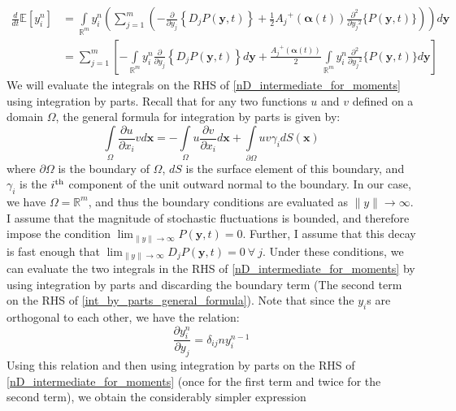 \begin{align}
\frac{d}{dt}\mathbb{E}[y_i^n] &= \int\limits_{\mathbb{R}^m} y_i^n \left(\sum\limits_{j=1}^{m}\left(-\frac{\partial}{\partial y_j}\left\{D_{j}P(\mathbf{y},t)\right\}+\frac{1}{2}{A_j}^{+}(\boldsymbol{\alpha}(t))\frac{\partial^2}{\partial{y_j}^2}\{P(\mathbf{y},t)\}\right)\right)d\mathbf{y}\\
&= \sum\limits_{j=1}^{m}\left[-\int\limits_{\mathbb{R}^m} y_i^n\frac{\partial}{\partial y_j}\left\{D_{j}P(\mathbf{y},t)\right\}d\mathbf{y} + \frac{{A_j}^{+}(\boldsymbol{\alpha}(t))}{2}\int\limits_{\mathbb{R}^m} y_i^n\frac{\partial^2}{\partial{y_j}^2}\{P(\mathbf{y},t)\}d\mathbf{y}\right]\label{nD_intermediate_for_moments}
\end{align}
We will evaluate the integrals on the RHS of \eqref{nD_intermediate_for_moments} using integration by parts. Recall that for any two functions $u$ and $v$ defined on a domain $\Omega$, the general formula for integration by parts is given by:
\begin{equation}
\label{int_by_parts_general_formula}
\int\limits_{\Omega}\frac{\partial u}{\partial x_i}vd\mathbf{x} = -\int\limits_{\Omega}u\frac{\partial v}{\partial x_i}d\mathbf{x} + \int\limits_{\partial\Omega}uv\gamma_{i}dS(\mathbf{x})
\end{equation}
where $\partial \Omega$ is the boundary of $\Omega$, $dS$ is the surface element of this boundary, and $\gamma_i$ is the $i\textsuperscript{th}$ component of the unit outward normal to the boundary. In our case, we have $\Omega = \mathbb{R}^m$, and thus the boundary conditions are evaluated as $\|y\| \to \infty$. I assume that the magnitude of stochastic fluctuations is bounded, and therefore impose the condition $\displaystyle \lim_{\|y\| \to \infty}  P(\mathbf{y},t) = 0$. Further, I assume that this decay is fast enough that $\displaystyle \lim_{\|y\| \to \infty}D_jP(\mathbf{y},t) = 0\ \forall \ j$. Under these conditions, we can evaluate the two integrals in the RHS of \eqref{nD_intermediate_for_moments} by using integration by parts and discarding the boundary term (The second term on the RHS of \eqref{int_by_parts_general_formula}). Note that since the $y_i$s are orthogonal to each other, we have the relation:
\begin{equation*}
\frac{\partial y_i ^{n}}{\partial y_j} = \delta_{ij}ny_i^{n-1}
\end{equation*}
Using this relation and then using integration by parts on the RHS of \eqref{nD_intermediate_for_moments} (once for the first term and twice for the second term), we obtain the considerably simpler expression
